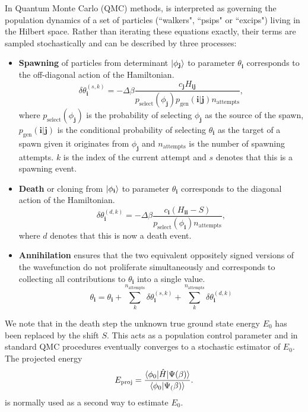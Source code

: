 \documentclass[%
 reprint,
 amsmath,amssymb,
 aps,
]{revtex4-2}
\begin{document}
In Quantum Monte Carlo (QMC) methods,  is interpreted as governing the population dynamics of a set of particles (``walkers", ``psips" or ``excips") living in the Hilbert space. Rather than iterating these equations exactly, their terms are sampled stochastically and can be described by three processes:\cite{Booth2009}
\begin{itemize}
\item \textbf{Spawning} of particles from determinant $\ket{\phi_\mathbf{j}}$ to parameter $\theta_\mathbf{i}$ corresponds to the off-diagonal action of the Hamiltonian.
\begin{equation} 
\delta \theta_\mathbf{i}^{(s, k)} = - \Delta\beta \frac{c_\mathbf{j}H_\mathbf{ij}}{p_\mathrm{select}(\phi_\mathbf{j}) p_\mathrm{gen}(\mathbf{i}|\mathbf{j}) n_\mathrm{attempts}},
\label{eq:pspawn}
\end{equation}
where $p_\mathrm{select}(\phi_\mathbf{j})$ is the probability of selecting $\phi_\mathbf{j}$ as the source of the spawn, $p_\mathrm{gen}(\mathbf{i}|\mathbf{j})$ is the conditional probability of selecting $\theta_\mathbf{i}$ as the target of a spawn given it originates from $\phi_\mathbf{j}$ and $n_\mathrm{attempts}$ is the number of spawning attempts. $k$ is the index of the current attempt and $s$ denotes that this is a spawning event.
\item \textbf{Death} or cloning from $\ket{\phi_\mathbf{i}}$ to parameter $\theta_\mathbf{i}$ corresponds to the diagonal action of the Hamiltonian.
\begin{equation} 
\delta \theta_\mathbf{i}^{(d, k)} = - \Delta\beta \frac{c_\mathbf{i} (H_\mathbf{ii} - S)}{p_\mathrm{select}(\phi_\mathbf{i}) n_\mathrm{attempts}},
\end{equation}
where $d$ denotes that this is now a death event.
\item \textbf{Annihilation} ensures that the two equivalent oppositely signed versions of the wavefunction do not proliferate simultaneously and corresponds to collecting all contributions to $\theta_\mathbf{i}$ into a single value.
\begin{equation}
\theta_\mathbf{i} = \theta_\mathbf{i} + \sum_k^{n_\mathrm{attempts}}\delta \theta_\mathbf{i}^{(s, k)} + \sum_k^{n_\mathrm{attempts}}\delta \theta_\mathbf{i}^{(d, k)}
\end{equation}
\end{itemize}
We note that in the death step the unknown true ground state energy $E_0$ has been replaced by the shift $S$. This acts as a population control parameter and in standard QMC procedures eventually converges to a stochastic estimator of $E_0$.\cite{Booth2009} The projected energy
\begin{equation}
    E_\mathrm{proj} = \frac{\braket{\phi_0|\hat H| \Psi(\beta)}}{\braket{\phi_0|\Psi_(\beta)}}.
    \label{eq:e_proj}
\end{equation}
is normally used as a second way to estimate $E_0$.
\end{document}
